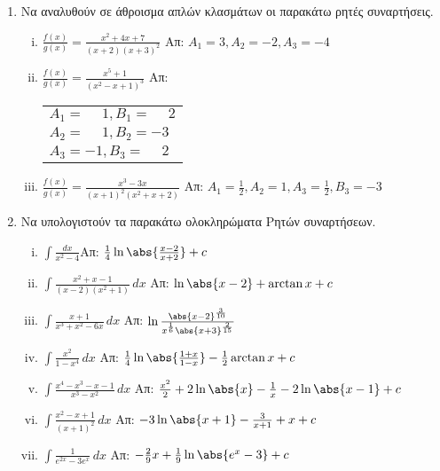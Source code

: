 


\pagestyle{askhseis}
\everymath{\displaystyle}




\begin{center}
  \minibox{\bfseries\large \textcolor{Col1}{Ολοκληρώματα Ρητών και Άρρητων Συναρτήσεων}}
\end{center}

\vspace{\baselineskip}

\begin{enumerate}
  \item Να αναλυθούν σε άθροισμα απλών κλασμάτων οι παρακάτω ρητές συναρτήσεις.
    \begin{enumerate}[i)]
      \item $\frac{f(x)}{g(x)}=\frac{x^2+4x+7}{(x+2)(x+3)^2}$ 
        \hfill Απ: $A_1=3, A_2=-2, A_3=-4$
      \item $\frac{f(x)}{g(x)}=\frac{x^5+1}{(x^2-x+1)^3}$ 
        \hfill Απ: \begin{tabular}{l} $A_1=\phantom{-}1, B_1=\phantom{-}2$ \\ 
          $A_2=\phantom{-}1, B_2=-3$ \\ $A_3=-1, B_3=\phantom{-}2$
        \end{tabular}
      \item $\frac{f(x)}{g(x)}=\frac{x^3-3x}{(x+1)^2(x^2+x+2)}$ 
        \hfill Απ: $A_1=\frac{1}{2}, A_2=1, A_3=\frac{1}{2}, B_3=-3$
    \end{enumerate}

  \item Να υπολογιστούν τα παρακάτω ολοκληρώματα Ρητών συναρτήσεων.
    \begin{enumerate}[i)]
      \item $\int\frac{dx}{x^2-4}$\hfill Απ: $\frac{1}{4}\ln\abs{\frac{x-2}{x+2}}+c$
      \item $\int\frac{x^2+x-1}{(x-2)(x^2+1)}\,dx$ \hfill Απ: $\ln\abs{x-2}+\arctan x+c$
      \item $\int\frac{x+1}{x^3+x^2-6x}\,dx$ 
        \hfill Απ: $\ln\frac{\abs{x-2}^{\frac{3}{10}}}{x^{\frac{1}{6}}
        \abs{x+3}^{\frac{2}{15}}}$
      \item $\int\frac{x^2}{1-x^4}\,dx$ 
        \hfill Απ: $\frac{1}{4}\ln\abs{\frac{1+x}{1-x}}-\frac{1}{2}\arctan x+c$
      \item $\int\frac{x^4-x^3-x-1}{x^3-x^2}\,dx$ 
        \hfill Απ: $\frac{x^2}{2}+2\ln\abs{x}-\frac{1}{x}-2\ln\abs{x-1}+c$
      \item $\int \frac{x^2-x+1}{(x+1)^2}\,dx$
        \hfill Απ: $-3\ln\abs{x+1}-\frac{3}{x+1}+x+c$
      \item $\int\frac{1}{e^{2x}-3e^{x}}\,dx$ 
        \hfill Απ: $-\frac{2}{9}x+\frac{1}{9}\ln\abs{e^x-3}+c$
    \end{enumerate}


\end{enumerate}
